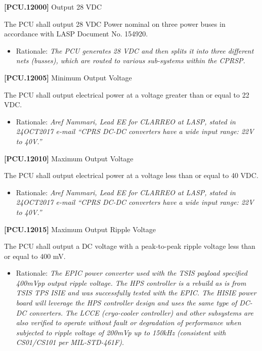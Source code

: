 \documentclass[12pt,oneside,oldfontcommands]{memoir}
\begin{document}
\textbf{[PCU.12000]} Output 28 \gls{VDC}

The \gls{PCU} shall output 28 \gls{VDC} Power nominal on three power buses in accordance with \gls{LASP} Document No. 154920.

\begin{itemize}
\item{} Rationale: \emph{The PCU generates 28 VDC and then splits it into three different nets (busses), which are routed to various sub-systems within the CPRSP.}

\end{itemize}

\textbf{[PCU.12005]} Minimum Output Voltage

The \gls{PCU} shall output electrical power at a voltage greater than or equal to 22 \gls{VDC}.

\begin{itemize}
\item{} Rationale: \emph{Aref Nammari, Lead EE for CLARREO at LASP, stated in 24OCT2017 e-mail ``CPRS DC-DC converters have a wide input range: 22V to 40V.''}

\end{itemize}

\textbf{[PCU.12010]} Maximum Output Voltage

The \gls{PCU} shall output electrical power at a voltage less than or equal to 40 \gls{VDC}.

\begin{itemize}
\item{} Rationale: \emph{Aref Nammari, Lead EE for CLARREO at LASP, stated in 24OCT2017 e-mail ``CPRS DC-DC converters have a wide input range: 22V to 40V.''}

\end{itemize}

\textbf{[PCU.12015]} Maximum Output Ripple Voltage

The \gls{PCU} shall output a DC voltage with a peak-to-peak ripple voltage less than or equal to 400 mV.

\begin{itemize}
\item{} Rationale: \emph{The EPIC power converter used with the TSIS payload specified 400mVpp output ripple voltage. The HPS controller is a rebuild as is from TSIS TPS ISIE and was successfully tested with the EPIC. The HISIE power board will leverage the HPS controller design and uses the same type of DC-DC converters. The LCCE (cryo-cooler controller) and other subsystems are also verified to operate without fault or degradation of performance when subjected to ripple voltage of 200mVp up to 150kHz (consistent with CS01\slash CS101 per MIL-STD-461F).}

\end{itemize}
\end{document}
